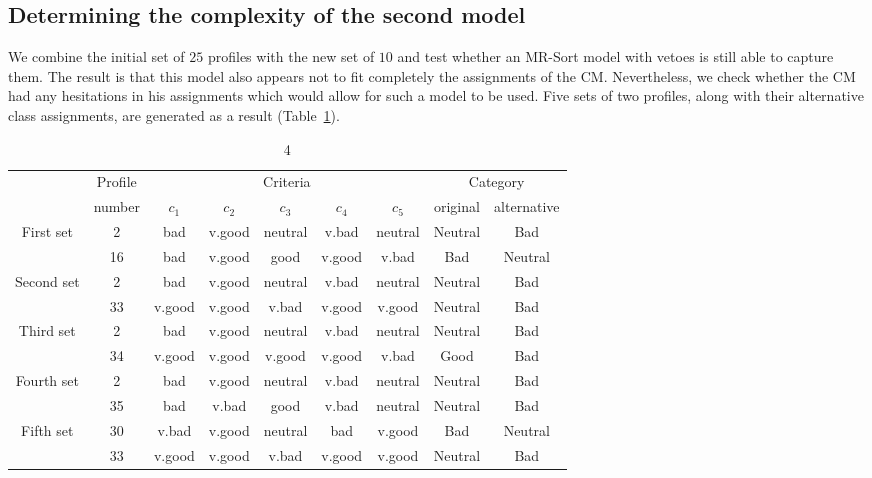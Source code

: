 \subsection{Determining the complexity of the second model}

We combine the initial set of $25$ profiles with the new set of $10$ and test whether an MR-Sort model with vetoes is still able to capture them. The result is that this model also appears not to fit completely the assignments of the CM. Nevertheless, we check whether the CM had any hesitations in his assignments which would allow for such a model to be used. Five sets of two profiles, along with their alternative class assignments, are generated as a result (Table~\ref{tab:ex1-step4}).

\begin{table}
\caption{4}\label{tab:ex1-step4}
\small

\begin{tabular}{ccccccc|cc}
&Profile& \multicolumn{5}{c}{Criteria} & \multicolumn{2}{|c}{Category} \\
&number& $c_1$ & $c_2$ & $c_3$ & $c_4$ & $c_5$ & \multicolumn{1}{c}{original} & \multicolumn{1}{c}{alternative} \\\hline
\multirow{2}{*}{First set}&         2 &        bad &     v.good &    neutral &      v.bad &    neutral &  Neutral & Bad \\
&        16 &        bad &     v.good &       good &     v.good &      v.bad  &  Bad & Neutral \\\hline
        
\multirow{2}{*}{Second set}&         2 &        bad &     v.good &    neutral &      v.bad &    neutral  &  Neutral & Bad \\
&        33 &     v.good &     v.good &      v.bad &     v.good &     v.good  &  Neutral & Bad \\\hline
         
\multirow{2}{*}{Third set}&         2 &        bad &     v.good &    neutral &      v.bad &    neutral  &  Neutral & Bad \\
&        34 &     v.good &     v.good &     v.good &     v.good &      v.bad  &  Good & Bad \\\hline
         
\multirow{2}{*}{Fourth set}&         2 &        bad &     v.good &    neutral &      v.bad &    neutral  &  Neutral & Bad \\
&                 35 &        bad &      v.bad &       good &      v.bad  & neutral  &  Neutral & Bad \\\hline
                 
\multirow{2}{*}{Fifth set}&        30 &      v.bad &     v.good &    neutral &        bad &     v.good  &  Bad & Neutral \\
&        33 &     v.good &     v.good &      v.bad &     v.good &     v.good  &  Neutral & Bad \\\hline
\end{tabular}
\end{table}

